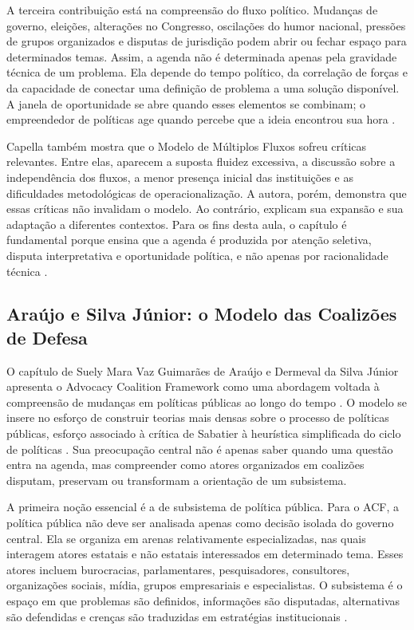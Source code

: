 \documentclass[12pt,a4paper]{article}
\begin{document}
A terceira contribuição está na compreensão do fluxo político. Mudanças de governo, eleições, alterações no Congresso, oscilações do humor nacional, pressões de grupos organizados e disputas de jurisdição podem abrir ou fechar espaço para determinados temas. Assim, a agenda não é determinada apenas pela gravidade técnica de um problema. Ela depende do tempo político, da correlação de forças e da capacidade de conectar uma definição de problema a uma solução disponível. A janela de oportunidade se abre quando esses elementos se combinam; o empreendedor de políticas age quando percebe que a ideia encontrou sua hora \autocites{kingdon2003agendas}[][]{capella2022multiplos}.

Capella também mostra que o Modelo de Múltiplos Fluxos sofreu críticas relevantes. Entre elas, aparecem a suposta fluidez excessiva, a discussão sobre a independência dos fluxos, a menor presença inicial das instituições e as dificuldades metodológicas de operacionalização. A autora, porém, demonstra que essas críticas não invalidam o modelo. Ao contrário, explicam sua expansão e sua adaptação a diferentes contextos. Para os fins desta aula, o capítulo é fundamental porque ensina que a agenda é produzida por atenção seletiva, disputa interpretativa e oportunidade política, e não apenas por racionalidade técnica \autocite{capella2022multiplos}.

\subsection{Araújo e Silva Júnior: o Modelo das Coalizões de Defesa}
\label{sec:org8cc8bf0}
O capítulo de Suely Mara Vaz Guimarães de Araújo e Dermeval da Silva Júnior apresenta o Advocacy Coalition Framework como uma abordagem voltada à compreensão de mudanças em políticas públicas ao longo do tempo \autocite{araujoSilva2022coalizoes}. O modelo se insere no esforço de construir teorias mais densas sobre o processo de políticas públicas, esforço associado à crítica de Sabatier à heurística simplificada do ciclo de políticas \autocite{sabatier1999theories}. Sua preocupação central não é apenas saber quando uma questão entra na agenda, mas compreender como atores organizados em coalizões disputam, preservam ou transformam a orientação de um subsistema.

A primeira noção essencial é a de subsistema de política pública. Para o ACF, a política pública não deve ser analisada apenas como decisão isolada do governo central. Ela se organiza em arenas relativamente especializadas, nas quais interagem atores estatais e não estatais interessados em determinado tema. Esses atores incluem burocracias, parlamentares, pesquisadores, consultores, organizações sociais, mídia, grupos empresariais e especialistas. O subsistema é o espaço em que problemas são definidos, informações são disputadas, alternativas são defendidas e crenças são traduzidas em estratégias institucionais \autocite{araujoSilva2022coalizoes}.
\end{document}
